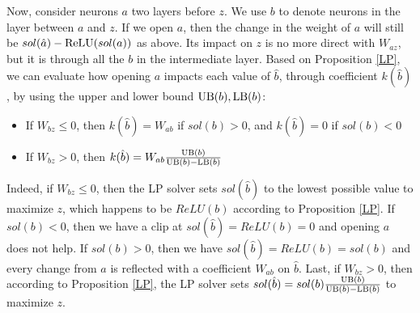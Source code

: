 % 			

\medskip

Now, consider neurons $a$ two layers before $z$. We use $b$ to denote neurons in the layer between $a$ and $z$. If we open $a$, then the change in the weight of $a$ will still be $sol(\hat{a})-\mathrm{ReLU}(sol(a))$ as above. Its impact on $z$ is no more direct with $W_{az}$, but it is through all the $b$ in the intermediate layer. 
Based on Proposition \ref{LP}, we can evaluate how opening $a$ impacts each value of 
$\hat{b}$, through coefficient $k(\hat{b})$, by using the upper and lower bound
$\mathrm{UB}(b),\mathrm{LB}(b)$:
\begin{itemize}
 \item If $W_{bz}\leq0$, then $k(\hat{b})=W_{ab}$ if $sol(b) > 0$, and $k(\hat{b})=0$ if $sol(b) < 0$
 \item If $W_{bz}>0$, then $k(\hat{b})=W_{ab} \frac{\mathrm{UB}(b)}{\mathrm{UB}(b)-\mathrm{LB}(b)}$
\end{itemize}

Indeed, if $W_{bz}\leq0$, then the LP solver sets $sol(\hat{b})$ to the lowest possible value to maximize $z$, which happens to be $ReLU(b)$ according to Proposition \ref{LP}.
If $sol(b) < 0$, then we have a clip at $sol(\hat{b})=ReLU(b)=0$ and opening $a$ does not help. If $sol(b) > 0$, then we have $sol(\hat{b})=ReLU(b)=sol(b)$ and every change from 
$a$ is reflected with a coefficient $W_{ab}$ on $\hat{b}$. 
Last, if $W_{bz}>0$, then according to Proposition \ref{LP}, the LP solver
sets $sol(\hat{b}) = sol(b) \frac{\mathrm{UB}(b)}{\mathrm{UB}(b)-\mathrm{LB}(b)}$ to maximize $z$.


